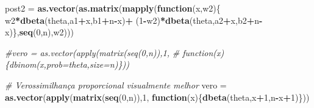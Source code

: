\documentclass[
]{book}
\newenvironment{Shaded}{\begin{snugshade}}{\end{snugshade}}
\newcommand{\CommentTok}[1]{\textcolor[rgb]{0.56,0.35,0.01}{\textit{#1}}}
\newcommand{\ControlFlowTok}[1]{\textcolor[rgb]{0.13,0.29,0.53}{\textbf{#1}}}
\newcommand{\DecValTok}[1]{\textcolor[rgb]{0.00,0.00,0.81}{#1}}
\newcommand{\KeywordTok}[1]{\textcolor[rgb]{0.13,0.29,0.53}{\textbf{#1}}}
\newcommand{\NormalTok}[1]{#1}
\newcommand{\OperatorTok}[1]{\textcolor[rgb]{0.81,0.36,0.00}{\textbf{#1}}}
\newcommand{\StringTok}[1]{\textcolor[rgb]{0.31,0.60,0.02}{#1}}
\begin{document}
\begin{Shaded}
\begin{Highlighting}[]
\NormalTok{post2 =}\StringTok{ }\KeywordTok{as.vector}\NormalTok{(}\KeywordTok{as.matrix}\NormalTok{(}\KeywordTok{mapply}\NormalTok{(}\ControlFlowTok{function}\NormalTok{(x,w2)\{}
\NormalTok{  w2}\OperatorTok{*}\KeywordTok{dbeta}\NormalTok{(theta,a1}\OperatorTok{+}\NormalTok{x,b1}\OperatorTok{+}\NormalTok{n}\OperatorTok{-}\NormalTok{x)}\OperatorTok{+}
\StringTok{  }\NormalTok{(}\DecValTok{1}\OperatorTok{-}\NormalTok{w2)}\OperatorTok{*}\KeywordTok{dbeta}\NormalTok{(theta,a2}\OperatorTok{+}\NormalTok{x,b2}\OperatorTok{+}\NormalTok{n}\OperatorTok{-}\NormalTok{x)\},}\KeywordTok{seq}\NormalTok{(}\DecValTok{0}\NormalTok{,n),w2)))}
   
\CommentTok{#vero = as.vector(apply(matrix(seq(0,n)),1,}
\CommentTok{# function(x)\{dbinom(x,prob=theta,size=n)\}))}

\CommentTok{# Verossimilhança proporcional visualmente melhor}
\NormalTok{vero =}\StringTok{ }\KeywordTok{as.vector}\NormalTok{(}\KeywordTok{apply}\NormalTok{(}\KeywordTok{matrix}\NormalTok{(}\KeywordTok{seq}\NormalTok{(}\DecValTok{0}\NormalTok{,n)),}\DecValTok{1}\NormalTok{,}
  \ControlFlowTok{function}\NormalTok{(x)\{}\KeywordTok{dbeta}\NormalTok{(theta,x}\OperatorTok{+}\DecValTok{1}\NormalTok{,n}\OperatorTok{-}\NormalTok{x}\OperatorTok{+}\DecValTok{1}\NormalTok{)\}))}


\end{Highlighting}
\end{Shaded}
\end{document}
